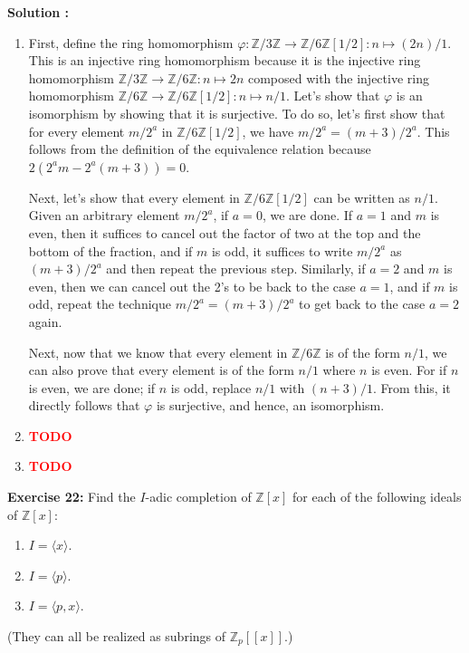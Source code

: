 \documentclass{article}
\newcommand{\Z}{\mathbb{Z}}
\newcommand{\Zn}[1]{\mathbb{Z}/ #1 \mathbb{Z}}
\newcommand{\td}{\textcolor{red}{\textbf{TODO}}}
\begin{document}
\noindent \textbf{Solution :}
\begin{enumerate}[label=(\alph*)]
    \item First, define the ring homomorphism $\varphi : \Zn{3} \to \Zn{6}[1/2] : n \mapsto (2n)/1$. This is an injective ring homomorphism because it is the injective ring homomorphism $\Zn{3} \to \Zn{6} : n \mapsto 2n$ composed with the injective ring homomorphism $\Zn{6} \to \Zn{6}[1/2] : n \mapsto n/1$. Let's show that $\varphi$ is an isomorphism by showing that it is surjective. To do so, let's first show that for every element $m/2^a$ in $\Zn{6}[1/2]$, we have $m/2^a = (m+3)/2^a$. This follows from the definition of the equivalence relation because $2(2^am - 2^a(m+3)) = 0$.
    
    Next, let's show that every element in $\Zn{6}[1/2]$ can be written as $n/1$. Given an arbitrary element $m/2^a$, if $a = 0$, we are done. If $a = 1$ and $m$ is even, then it suffices to cancel out the factor of two at the top and the bottom of the fraction, and if $m$ is odd, it suffices to write $m/2^a$ as $(m+3)/2^a$ and then repeat the previous step. Similarly, if $a = 2$ and $m$ is even, then we can cancel out the 2's to be back to the case $a = 1$, and if $m$ is odd, repeat the technique $m/2^a = (m+3)/2^a$ to get back to the case $a = 2$ again.
    
    Next, now that we know that every element in $\Zn{6}$ is of the form $n/1$, we can also prove that every element is of the form $n/1$ where $n$ is even. For if $n$ is even, we are done; if $n$ is odd, replace $n/1$ with $(n+3)/1$. From this, it directly follows that $\varphi$ is surjective, and hence, an isomorphism.
    \item \td
    \item \td
\end{enumerate}

\newpage

\noindent \textbf{Exercise 22:} Find the $I$-adic completion of $\Z[x]$ for each of the following ideals of $\Z[x]$:
\begin{enumerate}[label=(\alph*)]
    \item $I = \langle x \rangle$.
    \item $I = \langle p \rangle$.
    \item $I = \langle p, x \rangle$.
\end{enumerate}
\noindent (They can all be realized as subrings of $\Z_p[[x]]$.) \\
\end{document}
